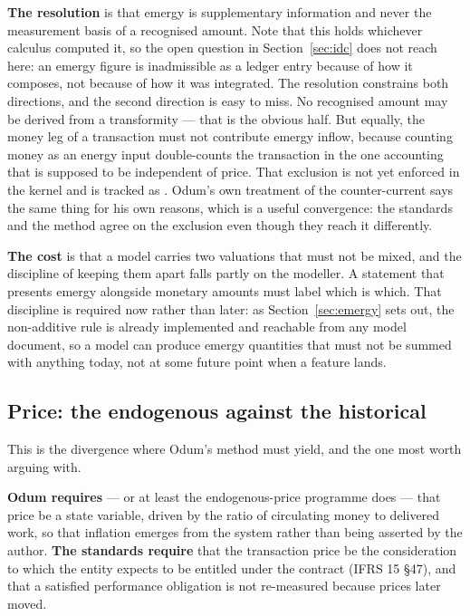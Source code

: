 \documentclass[11pt,a4paper]{article}
\begin{document}
\textbf{The resolution} is that emergy is supplementary information and never the measurement basis of a recognised amount. Note that this holds whichever calculus computed it, so the open question in Section~\ref{sec:idc} does not reach here: an emergy figure is inadmissible as a ledger entry because of how it composes, not because of how it was integrated. The resolution constrains both directions, and the second direction is easy to miss. No recognised amount may be derived from a transformity --- that is the obvious half. But equally, the money leg of a transaction must not contribute emergy inflow, because counting money as an energy input double-counts the transaction in the one accounting that is supposed to be independent of price. That exclusion is not yet enforced in the kernel and is tracked as . Odum's own treatment of the counter-current says the same thing for his own reasons, which is a useful convergence: the standards and the method agree on the exclusion even though they reach it differently.

\textbf{The cost} is that a model carries two valuations that must not be mixed, and the discipline of keeping them apart falls partly on the modeller. A statement that presents emergy alongside monetary amounts must label which is which. That discipline is required now rather than later: as Section~\ref{sec:emergy} sets out, the non-additive rule is already implemented and reachable from any model document, so a model can produce emergy quantities that must not be summed with anything today, not at some future point when a feature lands.

\subsection{Price: the endogenous against the historical}
\label{sec:price}

This is the divergence where Odum's method must yield, and the one most worth arguing with.

\textbf{Odum requires} --- or at least the endogenous-price programme does --- that price be a state variable, driven by the ratio of circulating money to delivered work, so that inflation emerges from the system rather than being asserted by the author. \textbf{The standards require} that the transaction price be the consideration to which the entity expects to be entitled under the contract (IFRS 15 \S47), and that a satisfied performance obligation is not re-measured because prices later moved.
\end{document}

